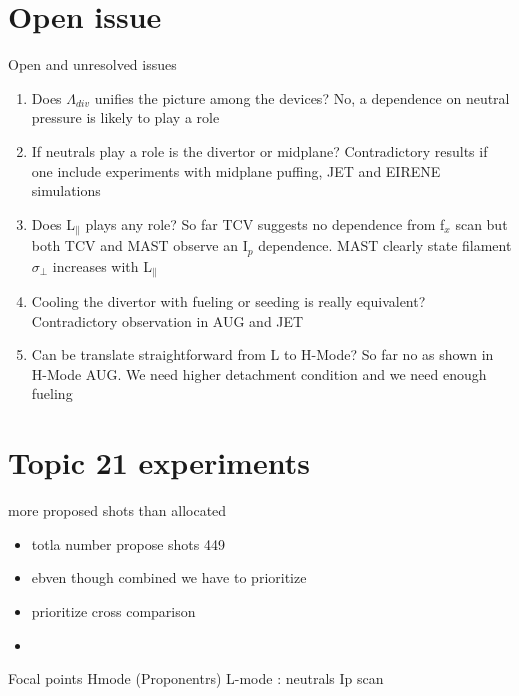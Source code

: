 \documentclass[10pt, compress, draft]{beamer}
\begin{document}
  \section{Open issue}
  \begin{frame}{Open and unresolved issues}
  \begin{enumerate}[<+(1) | invisible@-+>]
    \item Does $\Lambda_{div}$ unifies the picture among the devices?
      \alert{No, a dependence on neutral pressure is likely to play a role}
    \item If neutrals play a role is the divertor or midplane?
      \alert{Contradictory results if one include experiments with
        midplane puffing, JET and EIRENE simulations}
    \item Does L$_\parallel$ plays any role? \alert{So far TCV suggests no
      dependence from f$_x$ scan but both TCV and MAST observe an
      I$_p$ dependence. MAST clearly state filament $\sigma_{\perp}$
      increases with L$_{\parallel}$ }
    \item Cooling the divertor with fueling or seeding is really
      equivalent? \alert{Contradictory observation in AUG and JET}
    \item Can be translate straightforward from L to H-Mode? \alert{So
      far no as shown in H-Mode AUG. We need higher detachment
      condition and we need enough fueling}
    \end{enumerate}

  \end{frame}
  
\section{Topic 21 experiments }
\begin{frame}{more proposed shots than allocated}
	\begin{itemize}
		\item totla number propose shots 449
		\item ebven though combined we have to prioritize
		\item prioritize cross comparison 
		\item 
	\end{itemize}
\end{frame}

\begin{frame}{Focal points}
	Hmode (Proponentrs)
	L-mode :  neutrals Ip scan
\end{frame}
\end{document}
